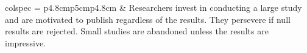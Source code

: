 \documentclass[
  man, donotrepeattitle,floatsintext]{apa7}
\begin{document}
\begin{longtblr}[
  caption = {The selection and regression models used in our robust Bayesian meta-analysis approach.},
  label = {tab:table1},
]{colspec = {p{4.8cm}p{5cm}p{4.8cm}}}
   &
  Researchers invest in conducting a large study and are motivated to publish regardless of the results. They persevere if null results are rejected. Small studies are abandoned unless the results are impressive. \\
\bottomrule
\end{longtblr}
\end{document}
